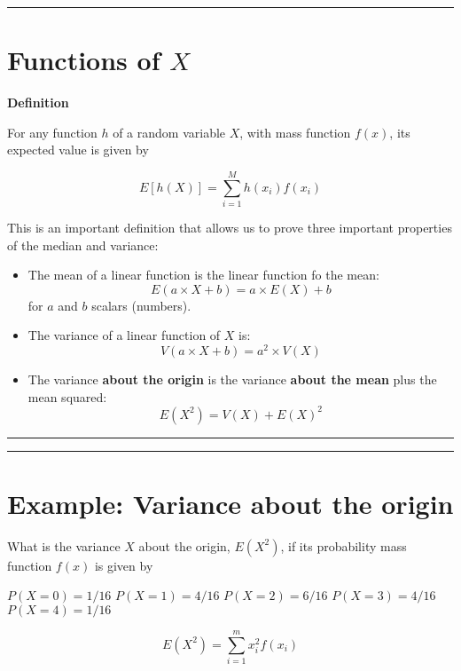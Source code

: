 \documentclass[
]{book}
\begin{document}
\begin{center}\rule{0.5\linewidth}{0.5pt}\end{center}

\hypertarget{functions-of-x}{%
\section{\texorpdfstring{Functions of \(X\)}{Functions of X}}\label{functions-of-x}}

\textbf{Definition}

For any function \(h\) of a random variable \(X\), with mass function \(f(x)\), its expected value is given by

\[ E[h(X)]= \sum_{i=1}^M h(x_i) f(x_i) \]

This is an important definition that allows us to prove three important properties of the median and variance:

\begin{itemize}
\item
  The mean of a linear function is the linear function fo the mean: \[E(a\times X +b)= a\times E(X) +b\] for \(a\) and \(b\) scalars (numbers).
\item
  The variance of a linear function of \(X\) is:\[V(a\times X +b)= a^2\times V(X)\]
\item
  The variance \textbf{about the origin} is the variance \textbf{about the mean} plus the mean squared: \[E(X^2)=V(X)+E(X)^2\]
\end{itemize}

\begin{center}\rule{0.5\linewidth}{0.5pt}\end{center}

\begin{center}\rule{0.5\linewidth}{0.5pt}\end{center}

\hypertarget{example-variance-about-the-origin}{%
\section{Example: Variance about the origin}\label{example-variance-about-the-origin}}

What is the variance \(X\) about the origin, \(E(X^2)\), if its probability mass function \(f(x)\) is given by

\(P(X=0)=1/16\)
\(P(X=1)=4/16\)
\(P(X=2)=6/16\)
\(P(X=3)=4/16\)
\(P(X=4)=1/16\)

\[E(X^2) =\sum_{i=1}^m x_i^2 f(x_i)\]
\end{document}
